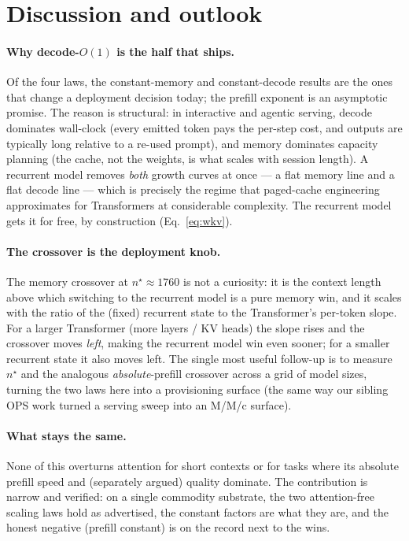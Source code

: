 \documentclass[11pt,a4paper]{article}
\newcommand{\ctx}{\ensuremath{n}}
\begin{document}
\section{Discussion and outlook}
\label{sec:discussion}

\paragraph{Why decode-\(O(1)\) is the half that ships.}
Of the four laws, the constant-memory and constant-decode results are the ones
that change a deployment decision today; the prefill exponent is an asymptotic
promise. The reason is structural: in interactive and agentic serving, decode
dominates wall-clock (every emitted token pays the per-step cost, and outputs
are typically long relative to a re-used prompt), and memory dominates capacity
planning (the cache, not the weights, is what scales with session length). A
recurrent model removes \emph{both} growth curves at once --- a flat memory line
and a flat decode line --- which is precisely the regime that paged-cache
engineering \citep{kwon2023vllm} approximates for Transformers at considerable
complexity. The recurrent model gets it for free, by construction
(Eq.~\eqref{eq:wkv}).

\paragraph{The crossover is the deployment knob.}
The memory crossover at \(\ctx^\star\approx\num{1760}\) is not a curiosity: it is
the context length above which switching to the recurrent model is a pure memory
win, and it scales with the ratio of the (fixed) recurrent state to the
Transformer's per-token slope. For a larger Transformer (more layers / KV heads)
the slope rises and the crossover moves \emph{left}, making the recurrent model
win even sooner; for a smaller recurrent state it also moves left. The single
most useful follow-up is to measure \(\ctx^\star\) and the analogous
\emph{absolute}-prefill crossover across a grid of model sizes, turning the two
laws here into a provisioning surface (the same way our sibling OPS work turned a
serving sweep into an M/M/c surface).

\paragraph{What stays the same.}
None of this overturns attention for short contexts or for tasks where its
absolute prefill speed and (separately argued) quality dominate. The
contribution is narrow and verified: on a single commodity substrate, the two
attention-free scaling laws hold as advertised, the constant factors are what
they are, and the honest negative (prefill constant) is on the record next to
the wins.
\end{document}
